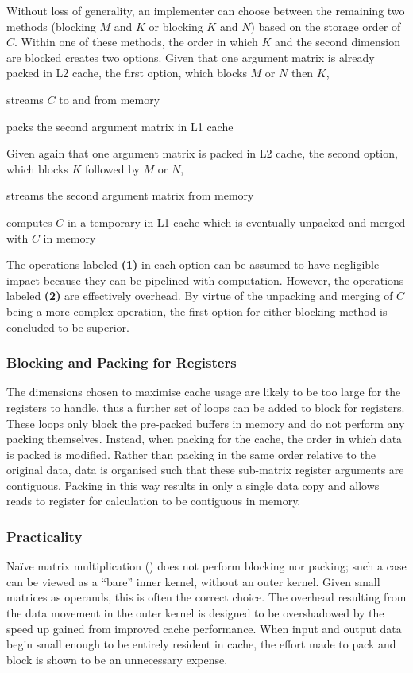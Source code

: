 \documentclass[\main/thesis.tex]{subfiles}
\begin{document}
Without loss of generality, an implementer can choose between the remaining two methods (blocking $M$ and $K$ or blocking $K$ and $N$) based on the storage order of $C$.
Within one of these methods, the order in which $K$ and the second dimension are blocked creates two options.
Given that one argument matrix is already packed in L2 cache, the first option, which blocks $M$ or $N$ then $K$,
\begin{enumerate*}[itemjoin*={{ and }}, label=\textbf{(\arabic*)}, after={.}]
  \item streams $C$ to and from memory
  \item packs the second argument matrix in L1 cache
\end{enumerate*}
Given again that one argument matrix is packed in L2 cache, the second option, which blocks $K$ followed by $M$ or $N$,
\begin{enumerate*}[itemjoin*={{ and }}, label=\textbf{(\arabic*)}, after={.}]
  \item streams the second argument matrix from memory
  \item computes $C$ in a temporary in L1 cache which is eventually unpacked and merged with $C$ in memory
\end{enumerate*}
The operations labeled \textbf{(1)} in each option can be assumed to have negligible impact because they can be pipelined with computation.
However, the operations labeled \textbf{(2)} are effectively overhead.
By virtue of the unpacking and merging of $C$ being a more complex operation, the first option for either blocking method is concluded to be superior.

\subsubsection{Blocking and Packing for Registers}
The dimensions chosen to maximise cache usage are likely to be too large for the registers to handle, thus a further set of loops can be added to block for registers.
These loops only block the pre-packed buffers in memory and do not perform any packing themselves.
Instead, when packing for the cache, the order in which data is packed is modified.
Rather than packing in the same order relative to the original data, data is organised such that these sub-matrix register arguments are contiguous.
Packing in this way results in only a single data copy and allows reads to register for calculation to be contiguous in memory.

\subsubsection{Practicality}
Na\"ive matrix multiplication (\ie {}) does not perform blocking nor packing; such a case can be viewed as a ``bare'' inner kernel, without an outer kernel.
Given small matrices as operands, this is often the correct choice.
The overhead resulting from the data movement in the outer kernel is designed to be overshadowed by the speed up gained from improved cache performance.
When input and output data begin small enough to be entirely resident in cache, the effort made to pack and block is shown to be an unnecessary expense.
\end{document}
